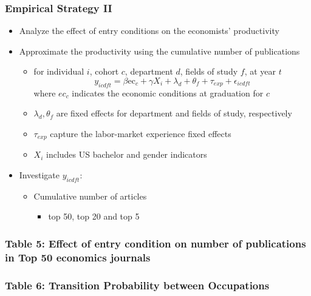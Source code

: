 \documentclass[10pt,svgnames,fragile]{beamer}
\begin{document}
{\begin{frame}
	\frametitle{Empirical Strategy II}
	\begin{itemize}
		\item Analyze the effect of entry conditions on the economists' productivity
		\vfill
		\item Approximate the productivity using the cumulative number of publications
		\vfill
		\begin{itemize}
			\item for individual $i$, cohort $c$, department $d$, fields of study $f$, at year $t$
			\begin{equation}
				y_{icdft} = \beta \text{ec}_{c}+\gamma X_{i}+\lambda_{d}+\theta_f +\tau_{exp}  +\epsilon_{icdft}
			\end{equation}
			where $ec_c$ indicates the economic conditions at graduation for $c$
			\item $\lambda_{d},\theta_f $ are fixed effects for department and fields of study, respectively
			\item $\tau_{exp}$ capture the labor-market experience fixed effects 
			\item $X_i$ includes US bachelor and gender indicators
		\end{itemize}
		\vfill
		\item Investigate $y_{icdft}$:
		\begin{itemize}
			\item Cumulative number of articles
			\begin{itemize}
				\item top 50, top 20 and top 5
			\end{itemize}
			\vfill
		\end{itemize}
	\end{itemize}
\end{frame}



{
\begin{frame}
	\frametitle{Table 5: Effect of entry condition on  number of publications in Top 50 economics journals}
	
\end{frame}}

\begin{frame}
	\frametitle{Table 6: Transition Probability between Occupations}
	
\end{frame}


%	




}
\end{document}
